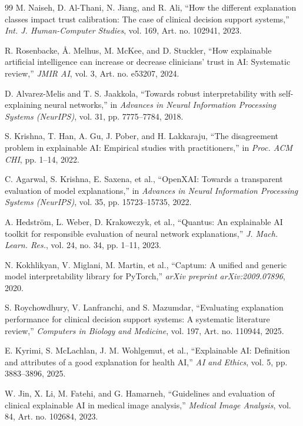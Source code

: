 \documentclass[3p,times,procedia]{elsarticle}
\theoremstyle{definition}
\begin{document}
\begin{thebibliography}{99}
M. Naiseh, D. Al-Thani, N. Jiang, and R. Ali,
``How the different explanation classes impact trust calibration: The case of clinical decision support systems,''
\textit{Int. J. Human-Computer Studies},
vol. 169, Art. no. 102941, 2023.

R. Rosenbacke, \AA. Melhus, M. McKee, and D. Stuckler,
``How explainable artificial intelligence can increase or decrease clinicians' trust in AI: Systematic review,''
\textit{JMIR AI}, vol. 3, Art. no. e53207, 2024.

D. Alvarez-Melis and T. S. Jaakkola,
``Towards robust interpretability with self-explaining neural networks,''
in \textit{Advances in Neural Information Processing Systems (NeurIPS)},
vol. 31, pp. 7775--7784, 2018.

S. Krishna, T. Han, A. Gu, J. Pober, and H. Lakkaraju,
``The disagreement problem in explainable AI: Empirical studies with practitioners,''
in \textit{Proc. ACM CHI}, pp. 1--14, 2022.

C. Agarwal, S. Krishna, E. Saxena, et al.,
``OpenXAI: Towards a transparent evaluation of model explanations,''
in \textit{Advances in Neural Information Processing Systems (NeurIPS)},
vol. 35, pp. 15723--15735, 2022.

A. Hedstr\"om, L. Weber, D. Krakowczyk, et al.,
``Quantus: An explainable AI toolkit for responsible evaluation of neural network explanations,''
\textit{J. Mach. Learn. Res.},
vol. 24, no. 34, pp. 1--11, 2023.

N. Kokhlikyan, V. Miglani, M. Martin, et al.,
``Captum: A unified and generic model interpretability library for PyTorch,''
\textit{arXiv preprint arXiv:2009.07896}, 2020.

S. Roychowdhury, V. Lanfranchi, and S. Mazumdar,
``Evaluating explanation performance for clinical decision support systems: A systematic literature review,''
\textit{Computers in Biology and Medicine},
vol. 197, Art. no. 110944, 2025.

E. Kyrimi, S. McLachlan, J. M. Wohlgemut, et al.,
``Explainable AI: Definition and attributes of a good explanation for health AI,''
\textit{AI and Ethics},
vol. 5, pp. 3883--3896, 2025.

W. Jin, X. Li, M. Fatehi, and G. Hamarneh,
``Guidelines and evaluation of clinical explainable AI in medical image analysis,''
\textit{Medical Image Analysis},
vol. 84, Art. no. 102684, 2023.


\end{thebibliography}
\end{document}
